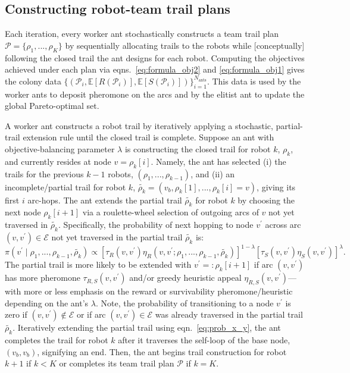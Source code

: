 \documentclass[fleqn,10pt,lineno]{wlpeerj}
\begin{document}
\subsection{Constructing robot-team trail plans}
Each iteration, every worker ant stochastically constructs a team trail plan $\mathcal{P}=\{\rho_1, ..., \rho_K\}$ by sequentially allocating trails to the robots while [conceptually] following the closed trail the ant designs for each robot. Computing the objectives achieved under each plan via eqns.~\ref{eq:formula_obj2} and \ref{eq:formula_obj1} gives the colony data $\{ (\mathcal{P}_i, \mathbb{E}[R(\mathcal{P}_i)], \mathbb{E}[S(\mathcal{P}_i)])\}_{i=1}^{N_{\text{ants}}}$. This data is used by the worker ants to deposit pheromone on the arcs and by the elitist ant to update the global Pareto-optimal set.

A worker ant constructs a robot trail by iteratively applying a stochastic, partial-trail extension rule until the closed trail is complete. Suppose an ant with objective-balancing parameter $\lambda$ is constructing the closed trail for robot $k$, $\rho_k$, and currently resides at node $v=\rho_k[i]$.
Namely, the ant has selected (i) the trails for the previous $k-1$ robots, $(\rho_1, ..., \rho_{k-1})$, and (ii) an incomplete/partial trail for robot $k$, $\tilde{\rho_k}=(v_b, \rho_k[1], ..., \rho_k[i]=v)$, giving its first $i$ arc-hops.
The ant extends the partial trail $\tilde{\rho_k}$ for robot $k$ by choosing the next node $\rho_k[i+1]$  
via a roulette-wheel selection of outgoing arcs of $v$ not yet traversed in $\tilde{\rho_k}$.
Specifically, the probability of next hopping to node $v^\prime$ across arc $(v, v^\prime)\in\mathcal{E}$ not yet traversed in the partial trail $\tilde{\rho_k}$ is:
 \begin{equation}
	\pi(v^\prime \mid \rho_1, ..., \rho_{k-1}, \tilde{\rho_k}) \propto 
		 \left[\tau_R(v, v^\prime) \eta_R(v, v^\prime; \rho_1, ..., \rho_{k-1},\tilde{\rho_k}) \right]^{1-\lambda} \left[ \tau_S(v, v^\prime) \eta_S(v, v^\prime) \right]^\lambda.
	 \label{eq:prob_x_y}
\end{equation}
The partial trail is more likely to be extended with $v^\prime=:\rho_k[i+1]$ if arc $(v, v^\prime)$ has more pheromone $\tau_{R, S}(v, v^\prime)$ and/or greedy heuristic appeal $\eta_{R, S}(v, v^\prime)$---with more or less emphasis on the reward or survivability pheromone/heuristic depending on the ant's $\lambda$.
Note, the probability of transitioning to a node $v^\prime$ is zero if $(v, v^\prime) \notin \mathcal{E}$ or if arc $(v, v^\prime) \in \mathcal{E}$ was already traversed in the partial trail $\tilde{\rho_k}$.
Iteratively extending the partial trail using eqn.~\ref{eq:prob_x_y}, the ant completes the trail for robot $k$ after it traverses the self-loop of the base node, $(v_b, v_b)$, signifying an end. Then, the ant begins trail construction for robot $k+1$ if $k<K$ or completes its team trail plan $\mathcal{P}$ if $k=K$. 
\end{document}
